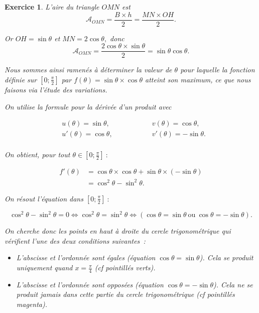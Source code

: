 \documentclass[10pt]{article}
\newtheorem{exo}{Exercice}
\begin{document}
\begin{exo}
L'aire du triangle $OMN$ est 
\[\mathcal{A}_{OMN}=\frac{B\times h}{2}=\frac{MN\times OH}{2}.\]

Or $OH=\sin\theta$ et $MN=2\cos\theta,$ donc
\[\mathcal{A}_{OMN}=\frac{2\cos\theta\times \sin\theta}{2}=\sin\theta \cos\theta.\]

Nous sommes ainsi ramenés à déterminer la valeur de $\theta$ pour laquelle la fonction définie sur $\left[0;\frac{\pi}{2}\right]$ par $f(\theta)= \sin\theta\times \cos\theta$ atteint son maximum, ce que nous faisons via l'étude des variations.

\medskip

On utilise la formule pour la dérivée d'un produit avec

\begin{alignat*}{3}
&u(\theta)=\sin\theta,&& \hspace{1cm}&&v(\theta)=\cos \theta, \\
& u'(\theta)=\cos\theta,&& &&v'(\theta)=-\sin\theta.\\
\end{alignat*}

On obtient, pour tout $\theta\in \left[0;\frac{\pi}{2}\right]~:$

\begin{align*}
f'(\theta)&=\cos\theta\times\cos \theta+\sin\theta\times(-\sin\theta)\\
&=\cos^2\theta-\sin^2\theta.
\end{align*}



\begin{multicols}{2}


On résout l'équation dans $\left[0;\frac{\pi}{2}\right]~:$

\[\cos^2\theta-\sin^2\theta=0\iff \cos^2\theta=\sin^2\theta\iff \left(\cos \theta=\sin\theta~\text{ou}~\cos \theta=-\sin\theta\right).\]%

On cherche donc les points en haut à droite du cercle trigonométrique qui vérifient l'une des deux conditions suivantes~:


\begin{itemize}
\item[\textcircled{\scriptsize{1}}] L'abscisse et l'ordonnée sont égales (équation $\cos \theta=\sin\theta$). Cela se produit uniquement quand $x=\frac{\pi}{4}$ (cf pointillés verts).
\item[\textcircled{\scriptsize{2}}] L'abscisse et l'ordonnée sont opposées (équation $\cos \theta=-\sin\theta$). Cela ne se produit jamais dans cette partie du cercle trigonométrique (cf pointillés magenta).
\end{itemize}


\end{multicols}
\end{exo}
\end{document}
